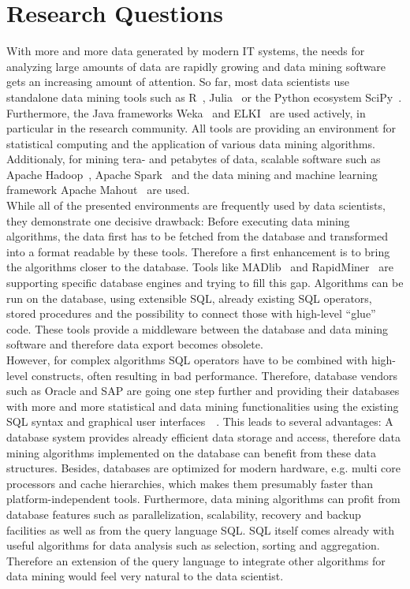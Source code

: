 \section{Research Questions}
With more and more data generated by modern IT systems, the needs for analyzing large amounts of data are rapidly growing and data mining software gets an increasing amount of attention. So far, most data scientists use standalone data mining tools such as R~\parencite{R/stats}, Julia~\parencite{DBLP:journals/corr/abs-1209-5145} or the Python ecosystem SciPy~\parencite{scipy}. Furthermore, the Java frameworks Weka~\parencite{Hall:2009:WDM:1656274.1656278} and ELKI~\parencite{DBLP:conf/ssdbm/AchtertKZ08} are used actively, in particular in the research community. All tools are providing an environment for statistical computing and the application of various data mining algorithms. Additionaly, for mining tera- and petabytes of data, scalable software such as Apache Hadoop~\parencite{hadoop}, Apache Spark~\parencite{spark} and the data mining and machine learning framework Apache Mahout~\parencite{mahout} are used.
\\
While all of the presented environments are frequently used by data scientists, they demonstrate one decisive drawback: Before executing data mining algorithms, the data first has to be fetched from the database and transformed into a format readable by these tools. Therefore a first enhancement is to bring the algorithms closer to the database. Tools like MADlib~\parencite{MADlib} and RapidMiner~\parencite{rapidminer} are supporting specific database engines and trying to fill this gap. Algorithms can be run on the database, using extensible SQL, already existing SQL operators, stored procedures and the possibility to connect those with high-level \enquote{glue} code. These tools provide a middleware between the database and data mining software and therefore data export becomes obsolete. 
\\
However, for complex algorithms SQL operators have to be combined with high-level constructs, often resulting in bad performance. Therefore, database vendors such as Oracle and SAP are going one step further and providing their databases with more and more statistical and data mining functionalities using the existing SQL syntax and graphical user interfaces~\parencite{oracle}~\parencite{pal}. This leads to several advantages: A database system provides already efficient data storage and access, therefore data mining algorithms implemented on the database can benefit from these data structures. Besides, databases are optimized for modern hardware, e.g. multi core processors and cache hierarchies, which makes them presumably faster than platform-independent tools. Furthermore, data mining algorithms can profit from database features such as parallelization, scalability, recovery and backup facilities as well as from the query language SQL. SQL itself comes already with useful algorithms for data analysis such as selection, sorting and aggregation. Therefore an extension of the query language to integrate other algorithms for data mining would feel very natural to the data scientist. 
